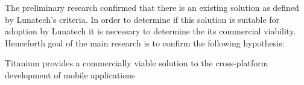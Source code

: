 
%
%




The preliminary research confirmed that there is an existing solution as defined by Lunatech's criteria. In order to determine if this solution is suitable for adoption by Lunatech it is necessary to determine the its commercial viability.
Henceforth goal of the main research is to confirm the following hypothesis:
\begin{shadequote}
Titanium provides a commercially viable solution to the cross-platform development of mobile applications%
\end{shadequote}










